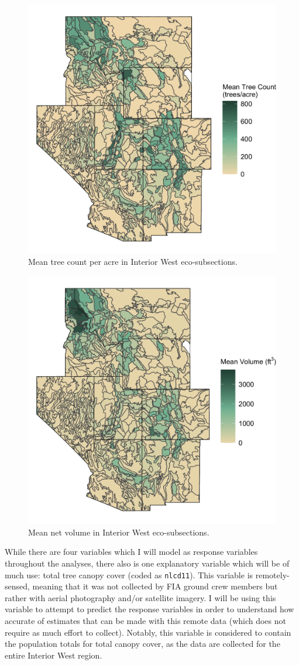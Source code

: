 \documentclass[12pt,twoside]{reedthesis}
\begin{document}
\begin{figure}

{\centering \includegraphics[width=0.65\linewidth]{figure/count_new} 

}

\caption[Mean tree count per acre in Interior West eco-subsections]{Mean tree count per acre in Interior West eco-subsections.}\label{fig:m3}
\end{figure}
\begin{figure}

{\centering \includegraphics[width=0.65\linewidth]{figure/voln_new} 

}

\caption[Mean net volume in Interior West eco-subsections]{Mean net volume in Interior West eco-subsections.}\label{fig:m4}
\end{figure}
While there are four variables which I will model as response variables throughout the analyses, there also is one explanatory variable which will be of much use: total tree canopy cover (coded as \texttt{nlcd11}). This variable is remotely-sensed, meaning that it was not collected by FIA ground crew members but rather with aerial photography and/or satellite imagery. I will be using this variable to attempt to predict the response variables in order to understand how accurate of estimates that can be made with this remote data (which does not require as much effort to collect). Notably, this variable is considered to contain the population totals for total canopy cover, as the data are collected for the entire Interior West region.
\end{document}
